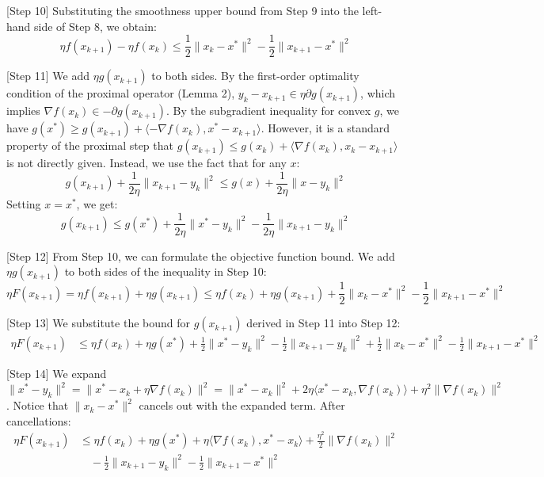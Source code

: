 \documentclass{article}
\begin{document}
[Step 10] Substituting the smoothness upper bound from Step 9 into the left-hand side of Step 8, we obtain:
\begin{equation}
    \eta f(x_{k+1}) - \eta f(x_k) \leq \frac{1}{2} \|x_k - x^*\|^2 - \frac{1}{2} \|x_{k+1} - x^*\|^2
\end{equation}

[Step 11] We add $\eta g(x_{k+1})$ to both sides. By the first-order optimality condition of the proximal operator (Lemma 2), $y_k - x_{k+1} \in \eta \partial g(x_{k+1})$, which implies $\nabla f(x_k) \in -\partial g(x_{k+1})$. By the subgradient inequality for convex $g$, we have $g(x^*) \geq g(x_{k+1}) + \langle -\nabla f(x_k), x^* - x_{k+1} \rangle$. However, it is a standard property of the proximal step that $g(x_{k+1}) \leq g(x_k) + \langle \nabla f(x_k), x_k - x_{k+1} \rangle$ is not directly given. Instead, we use the fact that for any $x$:
\begin{equation}
    g(x_{k+1}) + \frac{1}{2\eta} \|x_{k+1} - y_k\|^2 \leq g(x) + \frac{1}{2\eta} \|x - y_k\|^2
\end{equation}
Setting $x = x^*$, we get:
\begin{equation}
    g(x_{k+1}) \leq g(x^*) + \frac{1}{2\eta} \|x^* - y_k\|^2 - \frac{1}{2\eta} \|x_{k+1} - y_k\|^2
\end{equation}

[Step 12] From Step 10, we can formulate the objective function bound. We add $\eta g(x_{k+1})$ to both sides of the inequality in Step 10:
\begin{equation}
    \eta F(x_{k+1}) = \eta f(x_{k+1}) + \eta g(x_{k+1}) \leq \eta f(x_k) + \eta g(x_{k+1}) + \frac{1}{2} \|x_k - x^*\|^2 - \frac{1}{2} \|x_{k+1} - x^*\|^2
\end{equation}

[Step 13] We substitute the bound for $g(x_{k+1})$ derived in Step 11 into Step 12:
\begin{align}
    \eta F(x_{k+1}) &\leq \eta f(x_k) + \eta g(x^*) + \frac{1}{2} \|x^* - y_k\|^2 - \frac{1}{2} \|x_{k+1} - y_k\|^2 + \frac{1}{2} \|x_k - x^*\|^2 - \frac{1}{2} \|x_{k+1} - x^*\|^2
\end{align}

[Step 14] We expand $\|x^* - y_k\|^2 = \|x^* - x_k + \eta \nabla f(x_k)\|^2 = \|x^* - x_k\|^2 + 2\eta \langle x^* - x_k, \nabla f(x_k) \rangle + \eta^2 \|\nabla f(x_k)\|^2$. Notice that $\|x_k - x^*\|^2$ cancels out with the expanded term. After cancellations:
\begin{align}
    \eta F(x_{k+1}) &\leq \eta f(x_k) + \eta g(x^*) + \eta \langle \nabla f(x_k), x^* - x_k \rangle + \frac{\eta^2}{2} \|\nabla f(x_k)\|^2 \\
    &\quad - \frac{1}{2} \|x_{k+1} - y_k\|^2 - \frac{1}{2} \|x_{k+1} - x^*\|^2
\end{align}
\end{document}
